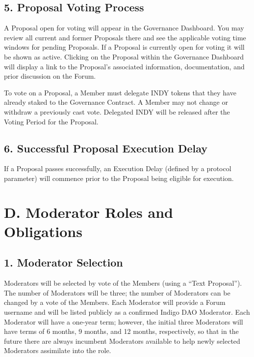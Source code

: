 \hypertarget{proposal-voting-process}{%
\subsection{5. Proposal Voting Process}\label{proposal-voting-process}}

A Proposal open for voting will appear in the Governance Dashboard. You
may review all current and former Proposals there and see the applicable
voting time windows for pending Proposals. If a Proposal is currently
open for voting it will be shown as active. Clicking on the Proposal
within the Governance Dashboard will display a link to the Proposal's
associated information, documentation, and prior discussion on the
Forum.

To vote on a Proposal, a Member must delegate INDY tokens that they have
already staked to the Governance Contract. A Member may not change or
withdraw a previously cast vote. Delegated INDY will be released after
the Voting Period for the Proposal.

\hypertarget{successful-proposal-execution-delay}{%
\subsection{6. Successful Proposal Execution
Delay}\label{successful-proposal-execution-delay}}

If a Proposal passes successfully, an Execution Delay (defined by a
protocol parameter) will commence prior to the Proposal being eligible
for execution.

\hypertarget{d.-moderator-roles-and-obligations}{%
\section{D. Moderator Roles and
Obligations}\label{d.-moderator-roles-and-obligations}}

\hypertarget{moderator-selection}{%
\subsection{1. Moderator Selection}\label{moderator-selection}}

Moderators will be selected by vote of the Members (using a ``Text
Proposal''). The number of Moderators will be three; the number of
Moderators can be changed by a vote of the Members. Each Moderator will
provide a Forum username and will be listed publicly as a confirmed
Indigo DAO Moderator. Each Moderator will have a one-year term; however,
the initial three Moderators will have terms of 6 months, 9 months, and
12 months, respectively, so that in the future there are always
incumbent Moderators available to help newly selected Moderators
assimilate into the role.

